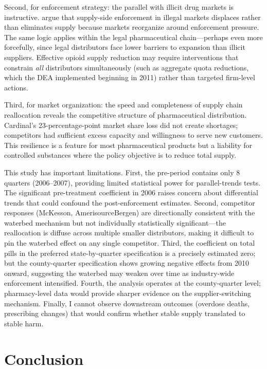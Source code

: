 \documentclass[12pt]{article}
\begin{document}
Second, for enforcement strategy: the parallel with illicit drug markets is instructive. \citet{reuter2010can} argue that supply-side enforcement in illegal markets displaces rather than eliminates supply because markets reorganize around enforcement pressure. The same logic applies within the legal pharmaceutical chain---perhaps even more forcefully, since legal distributors face lower barriers to expansion than illicit suppliers. Effective opioid supply reduction may require interventions that constrain \textit{all} distributors simultaneously (such as aggregate quota reductions, which the DEA implemented beginning in 2011) rather than targeted firm-level actions.

Third, for market organization: the speed and completeness of supply chain reallocation reveals the competitive structure of pharmaceutical distribution. Cardinal's 23-percentage-point market share loss did not create shortages; competitors had sufficient excess capacity and willingness to serve new customers. This resilience is a feature for most pharmaceutical products but a liability for controlled substances where the policy objective is to reduce total supply.

This study has important limitations. First, the pre-period contains only 8 quarters (2006--2007), providing limited statistical power for parallel-trends tests. The significant pre-treatment coefficient in 2006 raises concern about differential trends that could confound the post-enforcement estimates. Second, competitor responses (McKesson, AmerisourceBergen) are directionally consistent with the waterbed mechanism but not individually statistically significant---the reallocation is diffuse across multiple smaller distributors, making it difficult to pin the waterbed effect on any single competitor. Third, the coefficient on total pills in the preferred state-by-quarter specification is a precisely estimated zero; but the county-quarter specification shows growing negative effects from 2010 onward, suggesting the waterbed may weaken over time as industry-wide enforcement intensified. Fourth, the analysis operates at the county-quarter level; pharmacy-level data would provide sharper evidence on the supplier-switching mechanism. Finally, I cannot observe downstream outcomes (overdose deaths, prescribing changes) that would confirm whether stable supply translated to stable harm.

\section{Conclusion}
\end{document}
